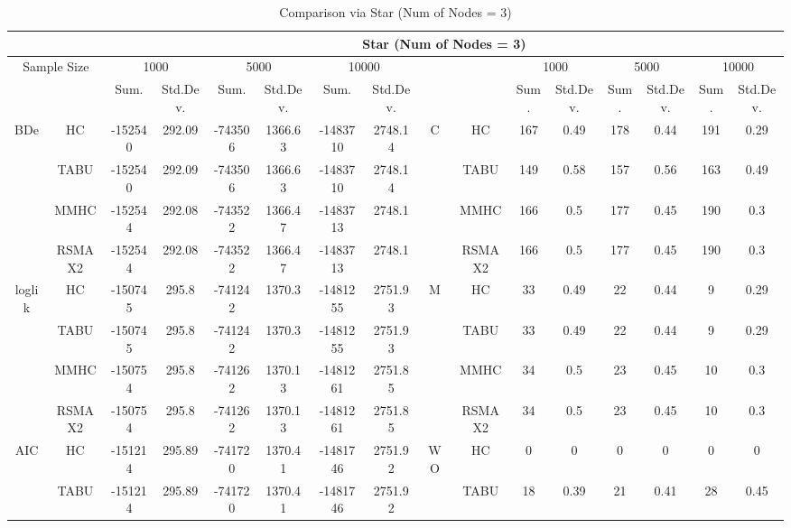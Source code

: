 \begin{table}[h]																										
\centering	\caption{Comparison via Star (Num of Nodes = 3)}	\tiny																						
{\tabcolsep=0.01in																										
\begin{tabular}{cc||cc|cc|cc||cc|cc|cc|cc}																										
\hline																										
&	&	\multicolumn{14}{c}{Star	(Num	of	Nodes	=	3)}\tabularnewline																			
\hline																										
\multicolumn{2}{c||}{Sample	Size}	&	\multicolumn{2}{c|}{1000}	&	\multicolumn{2}{c|}{5000}	&	\multicolumn{2}{c||}{10000}	&	&	&	\multicolumn{2}{c|}{1000}	&	\multicolumn{2}{c|}{5000}	&	\multicolumn{2}{c}{10000}\tabularnewline											
\hline																										
&	&	Sum.	&	Std.Dev.	&	Sum.	&	Std.Dev.	&	Sum.	&	Std.Dev.	&	&	&	Sum.	&	Std.Dev.	&	Sum.	&	Std.Dev.	&	Sum.	&	Std.Dev.\tabularnewline
\hline																										
\hline																										
\multirow{4}{*}{BDe} & HC &	-152540 & 	292.09 & 	-743506 & 	1366.63 & 	-1483710 & 	2748.14 & 	\multirow{4}{*}{C} & HC &	167 & 	0.49 & 	178 & 	0.44 & 	191 & 	0.29\tabularnewline													
& TABU &	-152540 & 	292.09 & 	-743506 & 	1366.63 & 	-1483710 & 	2748.14 & 	& TABU &	149 & 	0.58 & 	157 & 	0.56 & 	163 & 	0.49\tabularnewline													
& MMHC &	-152544 & 	292.08 & 	-743522 & 	1366.47 & 	-1483713 & 	2748.1 & 	& MMHC &	166 & 	0.5 & 	177 & 	0.45 & 	190 & 	0.3\tabularnewline													
& RSMAX2 &	-152544 & 	292.08 & 	-743522 & 	1366.47 & 	-1483713 & 	2748.1 & 	& RSMAX2 &	166 & 	0.5 & 	177 & 	0.45 & 	190 & 	0.3\tabularnewline													
\hline																										
\multirow{4}{*}{loglik} & HC &	-150745 & 	295.8 & 	-741242 & 	1370.3 & 	-1481255 & 	2751.93 & 	\multirow{4}{*}{M} & HC &	33 & 	0.49 & 	22 & 	0.44 & 	9 & 	0.29\tabularnewline													
& TABU &	-150745 & 	295.8 & 	-741242 & 	1370.3 & 	-1481255 & 	2751.93 & 	& TABU &	33 & 	0.49 & 	22 & 	0.44 & 	9 & 	0.29\tabularnewline													
& MMHC &	-150754 & 	295.8 & 	-741262 & 	1370.13 & 	-1481261 & 	2751.85 & 	& MMHC &	34 & 	0.5 & 	23 & 	0.45 & 	10 & 	0.3\tabularnewline													
& RSMAX2 &	-150754 & 	295.8 & 	-741262 & 	1370.13 & 	-1481261 & 	2751.85 & 	& RSMAX2 &	34 & 	0.5 & 	23 & 	0.45 & 	10 & 	0.3\tabularnewline													
\hline																										
\multirow{4}{*}{AIC} & HC &	-151214 & 	295.89 & 	-741720 & 	1370.41 & 	-1481746 & 	2751.92 & 	\multirow{4}{*}{WO} & HC &	0 & 	0 & 	0 & 	0 & 	0 & 	0\tabularnewline													
& TABU &	-151214 & 	295.89 & 	-741720 & 	1370.41 & 	-1481746 & 	2751.92 & 	& TABU &	18 & 	0.39 & 	21 & 	0.41 & 	28 & 	0.45\tabularnewline													

\end{tabular}}
\end{table}
